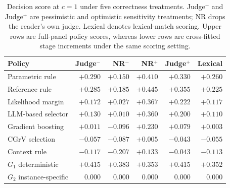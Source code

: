 \documentclass[sigconf]{acmart}
\newcommand{\CGrV}{CGrV}
\begin{document}
\begin{table}[t]\centering\scriptsize\setlength{\tabcolsep}{3pt}
\caption{Decision score at $c{=}1$ under five correctness treatments. Judge$^-$ and Judge$^+$ are pessimistic and optimistic sensitivity treatments; NR drops the reader's own judge. Lexical denotes lexical-match scoring. Upper rows are full-panel policy scores, whereas lower rows are cross-fitted stage increments under the same scoring setting.}
\label{tab:jury}
\begin{tabular}{@{}lrrrrr@{}}\toprule
Policy & Judge$^-$ & NR$^-$ & NR$^+$ & Judge$^+$ & Lexical\\\midrule
Parametric rule & $+0.290$ & $+0.150$ & $+0.410$ & $+0.330$ & $+0.260$\\
Reference rule & $+0.285$ & $+0.185$ & $+0.445$ & $+0.355$ & $+0.225$\\
Likelihood margin & $+0.172$ & $+0.027$ & $+0.367$ & $+0.222$ & $+0.117$\\
LLM-based selector & $+0.130$ & $+0.010$ & $+0.360$ & $+0.200$ & $+0.110$\\
Gradient boosting & $+0.011$ & $-0.096$ & $+0.230$ & $+0.079$ & $+0.003$\\
\CGrV{} selection & $-0.057$ & $-0.087$ & $+0.005$ & $-0.043$ & $-0.055$\\
Context rule & $-0.117$ & $-0.207$ & $+0.133$ & $-0.043$ & $-0.113$\\
\midrule
$G_1$ deterministic & $+0.415$ & $+0.383$ & $+0.353$ & $+0.415$ & $+0.352$\\
$G_2$ instance-specific & $0.000$ & $0.000$ & $0.000$ & $0.000$ & $0.000$\\
\bottomrule\end{tabular}\end{table}
\end{document}

